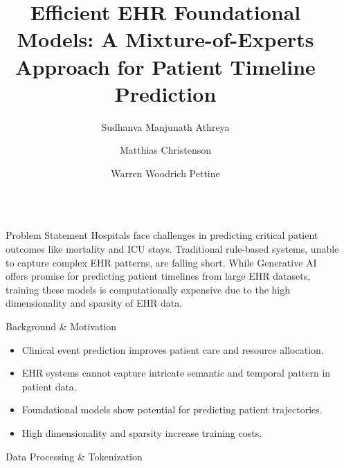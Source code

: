 \documentclass[final]{beamer}
\title{Efficient EHR Foundational Models: A Mixture-of-Experts Approach for Patient Timeline Prediction}
\author{Sudhanva Manjunath Athreya \and Matthias Christenson \and Warren Woodrich Pettine}
\institute{AI Summit 2025}
\newlength{\sepwidth}
\newlength{\colwidth}
\newcommand{\separatorcolumn}{\begin{column}{\sepwidth}\end{column}}
\begin{document}
\begin{frame}[t]
\begin{columns}[t]
\separatorcolumn

\begin{column}{\colwidth}

  \begin{alertblock} {Problem Statement}
    Hospitals face challenges in predicting critical patient outcomes like mortality and ICU stays. 
    Traditional rule-based systems, unable to capture complex EHR patterns, are falling short. 
    While Generative AI offers promise for predicting patient timelines from large EHR datasets, training these models is computationally expensive due to the high dimensionality and sparsity of EHR data.
    \end{alertblock}

    \begin{block} {Background \& Motivation}
        
        \begin{itemize}
            \item Clinical event prediction improves patient care and resource allocation.
            \item EHR systems cannot capture intricate semantic and temporal pattern in patient data.
            \item Foundational models show potential for predicting patient trajectories.
            \item High dimensionality and sparsity increase training costs.
        \end{itemize}

    \end{block}

    \begin{block}{Data Processing \& Tokenization}


\end{block}
\end{column}
\end{columns}
\end{frame}
\end{document}
